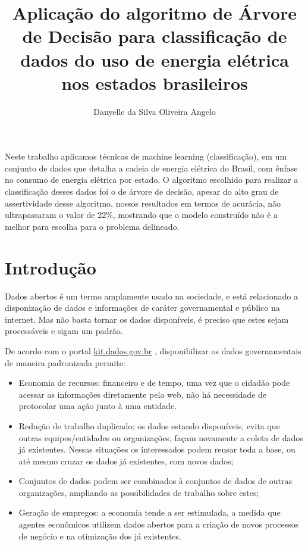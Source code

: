 \documentclass[12pt]{article}
\title{Aplicação do algoritmo de Árvore de Decisão para classificação de dados do uso de energia elétrica nos estados brasileiros}
\author{Danyelle da Silva Oliveira Angelo\inst{1}}
\begin{document}
 

\maketitle
     
\begin{resumo}
    Neste trabalho aplicamos técnicas de machine learning (classificação), em um conjunto de dados que detalha a cadeia de energia elétrica do Brasil, com ênfase no consumo de energia elétrica por estado. O algoritmo escolhido para realizar a classificação desses dados foi o de árvore de decisão, apesar do alto grau de assertividade desse algoritmo, nossos resultados em termos de acurácia, não ultrapassaram o valor de 22\%, mostrando que o modelo construído não é a melhor para escolha para o problema delineado.
    
    
\end{resumo}


\section{Introdução}
    Dados abertos é um termo amplamente usado na sociedade, e está relacionado a disponização de dados e informações de caráter governamental e público na internet. Mas não basta tornar os dados disponíveis, é preciso que estes sejam processáveis e sigam um padrão. 
    
    De acordo com o portal \href{kit.dados.gov.br}{kit.dados.gov.br} \cite{kit-dados-abertos}, disponibilizar os dados governamentais de maneira padronizada permite:
    
    \begin{itemize}
        \item Economia de recursos: financeiro e de tempo, uma vez que o cidadão pode acessar as informações diretamente pela web, não há necessidade de protocolar uma ação junto à uma entidade.
        \item Redução de trabalho duplicado: os dados estando disponíveis, evita que outras equipes/entidades ou organizações, façam novamente a coleta de dados já existentes. Nessas situações os interessados podem reusar toda a base, ou até mesmo cruzar os dados já existentes, com novos dados;
        \item Conjuntos de dados podem ser combinados à conjuntos de dados de outras organizações, ampliando as possibilidades de trabalho sobre estes;
        \item Geração de empregos: a economia tende a ser estimulada, a medida que agentes econômicos  utilizem dados abertos para a criação de novos processos de negócio e na otimização dos já existentes.
    \end{itemize}
\end{document}
